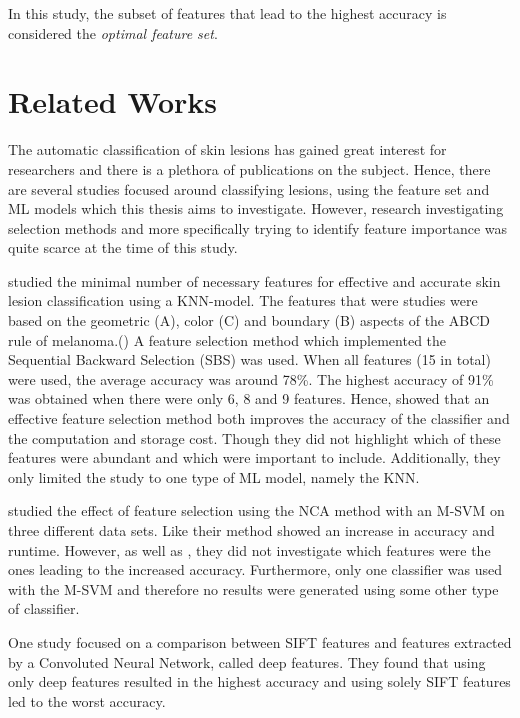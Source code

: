 \documentclass{kththesis}
\begin{document}
In this study, the subset of features that lead to the highest accuracy is considered the \emph{optimal feature set}.


\section{Related Works}


The automatic classification of skin lesions has gained great interest for researchers and there is a plethora of publications on the subject. Hence, there are several studies focused around classifying lesions, using the feature set and ML models which this thesis aims to investigate. However, research investigating selection methods and more specifically trying to identify feature importance was quite scarce at the time of this study. 

\parencite{MustafaSuleiman2017Fsus} studied the minimal number of necessary features for effective and accurate skin lesion classification using a KNN-model.  The features that were studies were based on the geometric (A), color (C)  and boundary (B) aspects of the ABCD rule of melanoma.(\parencite{MustafaSuleiman2017Fsus}) A feature selection method which implemented the Sequential Backward Selection (SBS) was used. When all features (15 in total) were used, the average accuracy was around 78\%. The highest accuracy of 91\% was obtained when there were only 6, 8 and 9 features. Hence, \parencite{MustafaSuleiman2017Fsus} showed that an effective feature selection method both improves the accuracy of the classifier and the computation and storage cost. Though they did not highlight which of these features were abundant and which were important to include. Additionally, they only limited the study to one type of ML model, namely the KNN. 

\parencite{MustafaSuleiman2017Fsus} studied the effect of feature selection using the NCA method with an M-SVM on three different data sets. Like \parencite{MustafaSuleiman2017Fsus} their method showed an increase in accuracy and runtime. However, as well as \parencite{MustafaSuleiman2017Fsus}, they did not investigate which features were the ones leading to the increased accuracy. Furthermore, only one classifier was used with the M-SVM and therefore no results were generated using some other type of classifier. 

One study focused on a comparison between SIFT features and features extracted by  a Convoluted Neural Network, called deep features. They found that using only deep features resulted in the highest accuracy and using solely SIFT features led to the worst accuracy.\parencite{Zhang}
\end{document}
